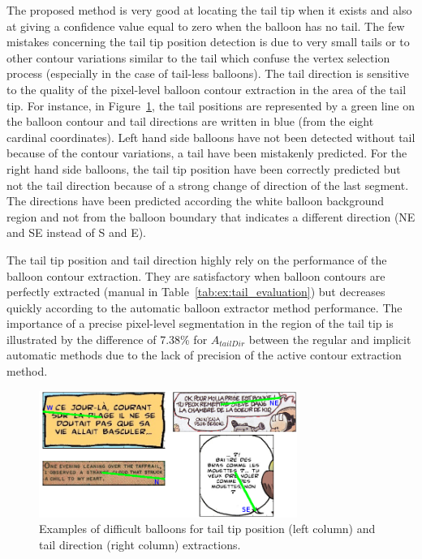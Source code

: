 
The proposed method is very good at locating the tail tip when it exists and also at giving a confidence value equal to zero when the balloon has no tail.
The few mistakes concerning the tail tip position detection is due to very small tails or to other contour variations similar to the tail which confuse the vertex selection process (especially in the case of tail-less balloons).
The tail direction is sensitive to the quality of the pixel-level balloon contour extraction in the area of the tail tip.
For instance, in Figure~\ref{fig:ex:tail_extraction_mistake_errors}, the tail positions are represented by a green line on the balloon contour and tail directions are written in blue (from the eight cardinal coordinates).
Left hand side balloons have not been detected without tail because of the contour variations, a tail have been mistakenly predicted.
For the right hand side balloons, the tail tip position have been correctly predicted but not the tail direction because of a strong change of direction of the last segment.
The directions have been predicted according the white balloon background region and not from the balloon boundary that indicates a different direction (NE and SE instead of S and E).

The tail tip position and tail direction highly rely on the performance of the balloon contour extraction.
They are satisfactory when balloon contours are perfectly extracted (manual in Table~\ref{tab:ex:tail_evaluation}) but decreases quickly according to the automatic balloon extractor method performance.
The importance of a precise pixel-level segmentation in the region of the tail tip is illustrated by the difference of 7.38\% for $A_{tailDir}$ between the regular and implicit automatic methods due to the lack of precision of the active contour extraction method.


  \begin{figure}[h]  %
    \centering
    \includegraphics[trim= 0px 0px 0px 0px, clip, width=0.75\textwidth]{tail_extraction_errors.png}
    \caption[Examples of difficult balloons for tail tip position and tail direction extractions]{Examples of difficult balloons for tail tip position (left column) and tail direction (right column) extractions.}
    \label{fig:ex:tail_extraction_mistake_errors}
  \end{figure}

